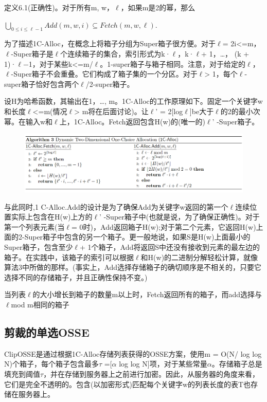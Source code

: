 \documentclass[UTF8]{article}
\begin{document}
定义6.1(正确性)。对于所有m, w，$\ell$，如果m是2的幂，那么

$\bigcup_{0 \leq i \leq \ell-1} {Add}(m, w, i) \subseteq {Fetch}(m, w, \ell)$.

为了描述1C-Alloc，在概念上将箱子分组为Super箱子很方便。对于$\ell$= 2i<=m，$\ell$-Super箱子是$\ell$个连续箱子的集合，索引形式为k·$\ell$，k·$\ell$+ 1，…， (k + 1)·$\ell$−1，对于某些k<=m/$\ell$。1-super箱子与箱子相同。注意，对于给定的$\ell$，$\ell$-Super箱子不会重叠。它们构成了箱子集的一个分区。对于$\ell$> 1，每个$\ell$-super箱子恰好包含两个$\ell$/2-super箱子。

设H为哈希函数，其输出在{1，…, m}。1C-Alloc的工作原理如下。固定一个关键字w和长度$\ell$<=m(情况$\ell$> m将在后面讨论)。让$\ell$' = 2[log$\ell$]be大于$\ell$的2的最小次幂。在输入w和$\ell$上，1C-Alloc。Fetch返回包含H(w)的(唯一的)$\ell$' -Super箱子。

\begin{figure}[ht]
  \centering
  \includegraphics[scale=0.35]{table5.png}
  \label{table5}
\end{figure}

与此同时,1 C-Alloc.Add的设计是为了确保Add为关键字w返回的第一个$\ell$连续位置实际上包含在H(w)上方的$\ell$' -Super箱子中(也就是说，为了确保正确性)。对于第一个列表元素(当$\ell$= 0时)，Add返回箱子H(w);对于第二个元素，它返回H(w)上面的2-Super箱子中包含的另一个箱子。更一般地说，如果S是H(w)上面最小的Super箱子，包含至少$\ell$+ 1个箱子，Add将返回S中还没有接收到元素的最左边的箱子。在实践中，该箱子的索引可以根据$\ell$和H(w)的二进制分解轻松计算，就像算法3中所做的那样。(事实上，Add选择存储箱子的确切顺序是不相关的，只要它选择不同的存储箱子，并且正确性保持不变。)

当列表$\ell$的大小增长到箱子的数量m以上时，Fetch返回所有的箱子，而add选择与$\ell$mod m相同的箱子

\subsection{剪裁的单选OSSE}
ClipOSSE是通过根据1C-Alloc存储列表获得的OSSE方案，使用m = O(N/ log log N)个箱子，每个箱子包含最多$\tau$ =[$\alpha$ log log N]项，对于某些常量$\alpha$。存储箱子总是填充到阈值$\tau$，并在存储到服务器上之前进行加密。因此，从服务器的角度来看，它们是完全不透明的。包含(以加密形式)匹配每个关键字w的列表长度的表T也存储在服务器上。
\end{document}

